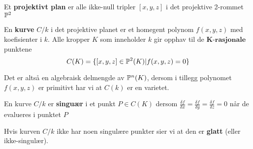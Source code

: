 \begin{definisjon}
Et \textbf{projektivt plan} er alle ikke-null tripler $[x, y, z]$ i det projektive 2-rommet $\mathbb{P}^2$
\end{definisjon}

\begin{definisjon}
En \textbf{kurve} $C/k$ i det projektive planet er et homegent polynom $f(x,y,z)$ med koefisienter i $k$. Alle kropper $K$ som inneholder $k$ gir opphav til de $\textbf{K-rasjonale}$ punktene $$C(K) = \{[x, y, z] \in \mathbb{P}^2(K) | f(x,y,z) = 0\}$$
\end{definisjon}

Det er altså en algebraisk delmengde av $\mathbb{P}^n(K)$, dersom i tillegg polynomet $f(x,y,z)$ er primitivt har vi at $C(k)$ er en varietet.

\begin{definisjon}
En kurve $C/k$ er \textbf{singuær} i et punkt $P \in C(K)$ dersom $ \frac{\delta f}{\delta x} = \frac{\delta f}{\delta y} = \frac{\delta f}{\delta z} = 0$ når de evalueres i punktet $P$

Hvis kurven $C/k$ ikke har noen singulære punkter sier vi at den er \textbf{glatt} (eller ikke-singulær).
\end{definisjon}
